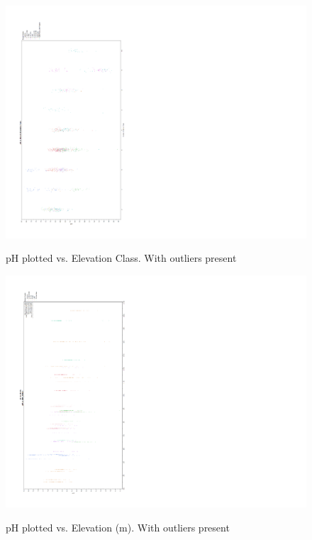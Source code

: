\documentclass[11pt]{article} %
\begin{document}
\begin{figure}[h!]
  \caption{pH plotted vs. Elevation Class.  With outliers present}
   \includegraphics[width=11 in,clip=true,trim=0 30 150 40]{CAgraph2}\\
\label{fig:figure2}
\end{figure}
\pagebreak

\begin{figure}[h!]
  \caption{pH plotted vs. Elevation (m).  With outliers present}
   \includegraphics[width=11 in,clip=true,trim=0 30 150 40]{CAgraph3}\\
\label{fig:figure3}
\end{figure}
\pagebreak
\end{document}

